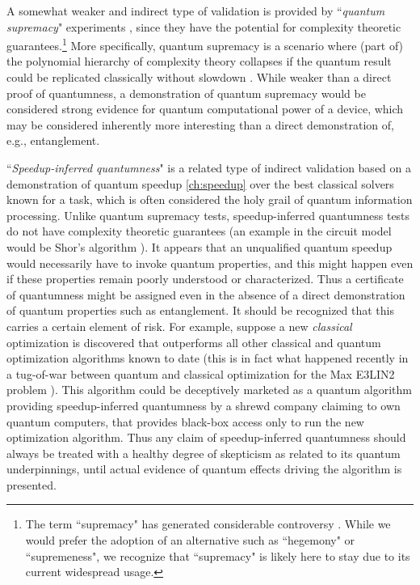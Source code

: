 A somewhat weaker and indirect type of validation is provided by ``\emph{quantum supremacy}" experiments \cite{Preskill:2012aa},
since they have the potential for complexity theoretic guarantees.\footnote{The term ``supremacy" has generated considerable controversy \cite{Qsupremacy-debate}. While we would prefer the adoption of an alternative such as ``hegemony" or ``supremeness", we recognize that ``supremacy" is likely here to stay due to its current widespread usage.}
 More specifically, quantum supremacy is a scenario where (part of) the polynomial hierarchy of complexity theory collapses if the quantum result could be replicated classically without slowdown \cite{Aaronson:2016aa,Bremner:2016aa,FarhiHarrow-QAOA,Gao:2017aa,Boixo:2016aa,Fefferman:2017ab}. While weaker than a direct proof of quantumness, a demonstration of quantum supremacy would be considered strong evidence for quantum computational power of a device, which may be considered inherently more interesting than a direct demonstration of, e.g., entanglement.

``\emph{Speedup-inferred quantumness}" is a related type of indirect validation based on a demonstration of quantum speedup \cite{speedup}\ref{ch:speedup} over the best classical solvers known for a task, which is often considered the holy grail of quantum information processing. Unlike quantum supremacy tests, speedup-inferred quantumness tests do not have complexity theoretic guarantees (an example in the circuit model would be Shor's algorithm \cite{Shor:97}). It appears that an unqualified quantum speedup would necessarily have to invoke quantum properties, and this might happen even if these properties remain poorly understood or characterized. Thus a certificate of quantumness might be assigned even in the absence of a direct demonstration of quantum properties such as entanglement. It should be recognized that this carries a certain element of risk. For example, suppose a new \emph{classical} optimization is discovered that outperforms all other classical and quantum optimization algorithms known to date (this is in fact what happened recently in a tug-of-war between quantum and classical optimization for the Max E3LIN2 problem \cite{Farhi:2014aa}). This algorithm could be deceptively marketed as a quantum algorithm providing speedup-inferred quantumness by a shrewd company claiming to own quantum computers, that provides black-box access only to run the new optimization algorithm. Thus any claim of speedup-inferred quantumness should always be treated with a healthy degree of skepticism as related to its quantum underpinnings, until actual evidence of quantum effects driving the algorithm is presented.

